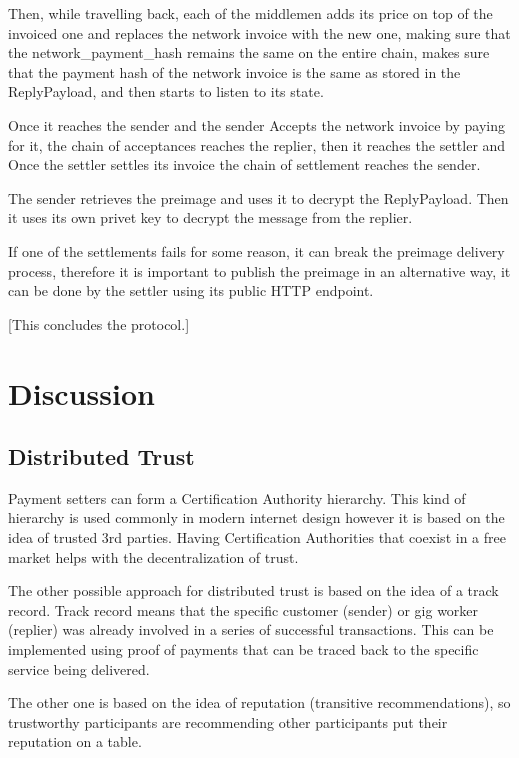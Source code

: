 \documentclass{article}
\begin{document}
Then, while travelling back, each of the middlemen adds its price on top of the invoiced one and replaces the network invoice with the new one, making sure that the network\_payment\_hash remains the same on the entire chain, makes sure that the payment hash of the network invoice is the same as stored in the ReplyPayload, and then starts to listen to its state.

Once it reaches the sender and the sender Accepts the network invoice by paying for it, the chain of acceptances reaches the replier, then it reaches the settler and Once the settler settles its invoice the chain of settlement reaches the sender.

The sender retrieves the preimage and uses it to decrypt the ReplyPayload. Then it uses its own privet key to decrypt the message from the replier.

If one of the settlements fails for some reason, it can break the preimage delivery process, therefore it is important to publish the preimage in an alternative way, it can be done by the settler using its public HTTP endpoint.

[This concludes the protocol.]

\section{Discussion}

\subsection{Distributed Trust}

Payment setters can form a Certification Authority hierarchy. This kind of hierarchy is used commonly in modern internet design however it is based on the idea of trusted 3rd parties. Having Certification Authorities that coexist in a free market helps with the decentralization of trust.

The other possible approach for distributed trust is based on the idea of a track record. Track record means that the specific customer (sender) or gig worker (replier) was already involved in a series of successful transactions. This can be implemented using proof of payments that can be traced back to the specific service being delivered.

The other one is based on the idea of reputation (transitive recommendations), so trustworthy participants are recommending other participants put their reputation on a table.
\end{document}
